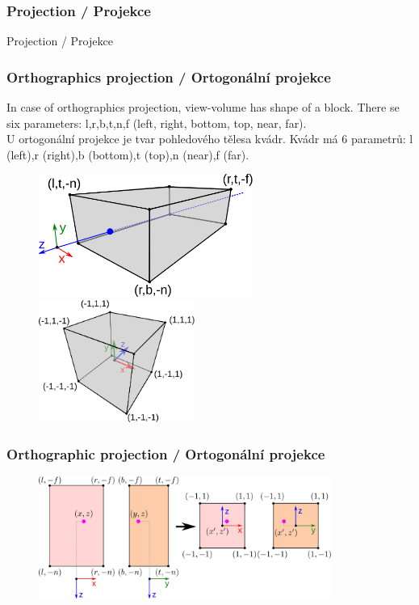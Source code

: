 \begin{frame}
\frametitle{Projection / Projekce}
\begin{center}
\Huge {\color{white}Projection / Projekce}
\end{center}
\end{frame}

\begin{frame}\frametitle{Orthographics projection / Ortogonální projekce}
In case of orthographics projection, view-volume has shape of a block.
There se six parameters: l,r,b,t,n,f (left, right, bottom, top, near, far).\\
U ortogonální projekce je tvar pohledového tělesa kvádr.
Kvádr má 6 parametrů: l (left),r (right),b (bottom),t (top),n (near),f (far).
\begin{figure}[htb]
	\includegraphics[height=4cm,keepaspectratio]{pics/projection/ortho}
	\includegraphics[height=4cm,keepaspectratio]{pics/projection/ndc}
\end{figure}
\end{frame}

\begin{frame}
\frametitle{Orthographic projection / Ortogonální projekce}
\begin{figure}[htb]
	\includegraphics[height=4cm,keepaspectratio]{pics/projection/fromortho}
\end{figure}
\end{frame}

